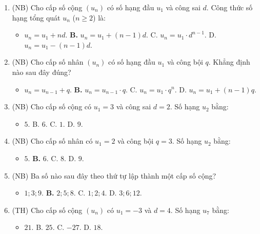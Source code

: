 \documentclass[12pt, a4paper]{article}
\begin{document}
\begin{enumerate}[leftmargin=0.6cm]
    \item (NB) Cho cấp số cộng $(u_n)$ có số hạng đầu $u_1$ và công sai $d$. Công thức số hạng tổng quát $u_n$ ($n \ge 2$) là:
    \begin{itemize}[leftmargin=0.6cm]
        \item[A.] $u_n = u_1 + nd$. \quad \textbf{B.} $u_n = u_1 + (n-1)d$. \quad C. $u_n = u_1 \cdot d^{n-1}$. \quad D. $u_n = u_1 - (n-1)d$.
    \end{itemize}

    \item (NB) Cho cấp số nhân $(u_n)$ có số hạng đầu $u_1$ và công bội $q$. Khẳng định nào sau đây đúng?
    \begin{itemize}[leftmargin=0.6cm]
        \item[A.] $u_{n} = u_{n-1} + q$. \quad \textbf{B.} $u_n = u_{n-1} \cdot q$. \quad C. $u_n = u_1 \cdot q^n$. \quad D. $u_n = u_1 + (n-1)q$.
    \end{itemize}

    \item (NB) Cho cấp số cộng có $u_1 = 3$ và công sai $d = 2$. Số hạng $u_2$ bằng:
    \begin{itemize}[leftmargin=0.6cm]
        \item[\textbf{A.}] $5$. \quad B. $6$. \quad C. $1$. \quad D. $9$.
    \end{itemize}

    \item (NB) Cho cấp số nhân có $u_1 = 2$ và công bội $q = 3$. Số hạng $u_2$ bằng:
    \begin{itemize}[leftmargin=0.6cm]
        \item[A.] $5$. \quad \textbf{B.} $6$. \quad C. $8$. \quad D. $9$.
    \end{itemize}

    \item (NB) Ba số nào sau đây theo thứ tự lập thành một cấp số cộng?
    \begin{itemize}[leftmargin=0.6cm]
        \item[A.] $1; 3; 9$. \quad \textbf{B.} $2; 5; 8$. \quad C. $1; 2; 4$. \quad D. $3; 6; 12$.
    \end{itemize}

    \item (TH) Cho cấp số cộng $(u_n)$ có $u_1 = -3$ và $d = 4$. Số hạng $u_7$ bằng:
    \begin{itemize}[leftmargin=0.6cm]
        \item[\textbf{A.}] $21$. \quad B. $25$. \quad C. $-27$. \quad D. $18$.
    \end{itemize}


\end{enumerate}
\end{document}
